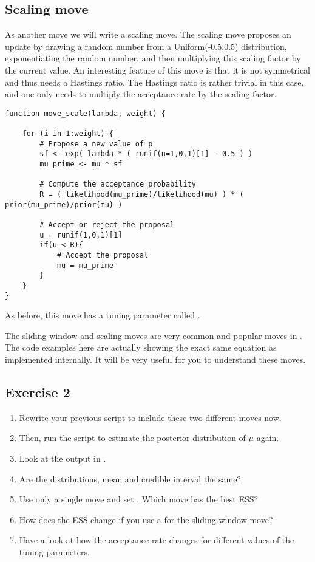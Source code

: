 \subsection{Scaling move}
As another move we will write a scaling move.
The scaling move proposes an update by drawing a random number from a Uniform(-0.5,0.5) distribution, exponentiating the random number, and then multiplying this scaling factor by the current value.
An interesting feature of this move is that it is not symmetrical and thus needs a Hastings ratio.
The Hastings ratio is rather trivial in this case, and one only needs to multiply the acceptance rate by the scaling factor.
{\tt \begin{snugshade*}
\begin{lstlisting}    
function move_scale(lambda, weight) {

    for (i in 1:weight) {
        # Propose a new value of p
        sf <- exp( lambda * ( runif(n=1,0,1)[1] - 0.5 ) )
        mu_prime <- mu * sf

        # Compute the acceptance probability
        R = ( likelihood(mu_prime)/likelihood(mu) ) * ( prior(mu_prime)/prior(mu) ) 

        # Accept or reject the proposal
        u = runif(1,0,1)[1] 
        if(u < R){
            # Accept the proposal
            mu = mu_prime 
        }
    }
}
\end{lstlisting}
\end{snugshade*}}
As before, this move has a tuning parameter called .

\begin{framed}
\IMPORANT The sliding-window and scaling moves are very common and popular moves in \RevBayes.
The code examples here are actually showing the exact same equation as implemented internally.
It will be very useful for you to understand these moves.	
\end{framed}


\subsection{Exercise 2}

\begin{enumerate}[label=\textnormal{Step \arabic*)}]
	\item Rewrite your previous script to include these two different moves now.
	\item Then, run the script to estimate the posterior distribution of $\mu$ again.
	\item Look at the output in \Tracer.
	\item Are the distributions, mean and credible interval the same?
	\item Use only a single move and set . Which move has the best ESS?
	\item How does the ESS change if you use a  for the sliding-window move?
	\item Have a look at how the acceptance rate changes for different values of the tuning parameters.
\end{enumerate}



